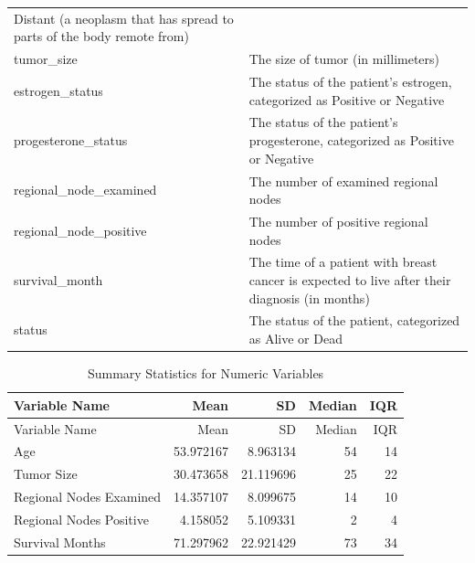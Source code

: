 \documentclass[
]{article}
\begin{document}
\begin{longtable}[]{@{}
  >{\raggedright\arraybackslash}p{}
  >{\raggedright\arraybackslash}p{}@{}}
Distant (a neoplasm that has spread to parts of the body remote from) \\
tumor\_size & The size of tumor (in millimeters) \\
estrogen\_status & The status of the patient's estrogen, categorized as
Positive or Negative \\
progesterone\_status & The status of the patient's progesterone,
categorized as Positive or Negative \\
regional\_node\_examined & The number of examined regional nodes \\
regional\_node\_positive & The number of positive regional nodes \\
survival\_month & The time of a patient with breast cancer is expected
to live after their diagnosis (in months) \\
status & The status of the patient, categorized as Alive or Dead \\
\end{longtable}

\begin{longtable}[]{@{}lrrrr@{}}
\caption{Summary Statistics for Numeric Variables}\tabularnewline
\toprule\noalign{}
Variable Name & Mean & SD & Median & IQR \\
\midrule\noalign{}
\endfirsthead
\toprule\noalign{}
Variable Name & Mean & SD & Median & IQR \\
\midrule\noalign{}
\endhead
\bottomrule\noalign{}
\endlastfoot
Age & 53.972167 & 8.963134 & 54 & 14 \\
Tumor Size & 30.473658 & 21.119696 & 25 & 22 \\
Regional Nodes Examined & 14.357107 & 8.099675 & 14 & 10 \\
Regional Nodes Positive & 4.158052 & 5.109331 & 2 & 4 \\
Survival Months & 71.297962 & 22.921429 & 73 & 34 \\
\end{longtable}
\end{document}
